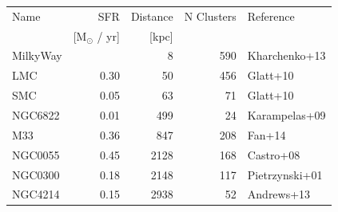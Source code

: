 \begin{appendix}
\begin{table}
\begin{tabular}{lrrrl}
    \hline
    \hline
    Name     & SFR                  & Distance  & N Clusters & Reference      \\
             & [M$_\odot$ / yr]     & [kpc]     &            &                \\
    \hline
    MilkyWay &                      & 8         & 590        & Kharchenko+13  \\
    LMC      & 0.30                 & 50        & 456        & Glatt+10       \\
    SMC      & 0.05                 & 63        & 71         & Glatt+10       \\
    NGC6822  & 0.01                 & 499       & 24         & Karampelas+09  \\
    M33      & 0.36                 & 847       & 208        & Fan+14         \\
    NGC0055  & 0.45                 & 2128      & 168        & Castro+08      \\
    NGC0300  & 0.18                 & 2148      & 117        & Pietrzynski+01 \\
    NGC4214  & 0.15                 & 2938      & 52         & Andrews+13     \\
    \hline
    \end{tabular}
\end{table}








\end{appendix}
